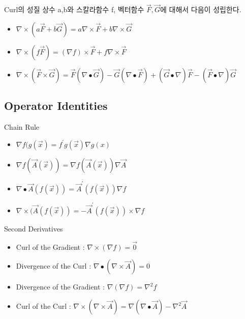 \documentclass{beamer}
\begin{document}
\begin{frame}{Curl의 성질} 
상수 a,b와 스칼라함수 f, 벡터함수 $\vec{F}, \vec{G}$에 대해서 다음이 성립한다. 
\begin{itemize} 
\item $\nabla \times (a\vec{F} + b\vec{G}) = a \nabla \times \vec{F} + b \nabla \times \vec{G}$
\item $\nabla  \times (f \vec{F}) = (\nabla f) \times \vec{F}   + f \nabla \times \vec{F}$
\item $\nabla \times (\vec{F} \times \vec{G}) = \vec{F} (\nabla \bullet \vec{G}) - \vec{G} (\nabla \bullet \vec{F}) + (\vec{G} \bullet \nabla)\vec{F} - (\vec{F} \bullet \nabla) \vec{G}$
\end{itemize}
\end{frame}


\subsection{Operator Identities}


\begin{frame}{Chain Rule}  
\begin{itemize} 
\item $\nabla f(g(\vec{x}) = f^{\prime}g(\vec{x}) \nabla g(x)$ 
\item $\nabla f(\vec{A}(\vec{x})) = \nabla f(\vec{A}(\vec{x})) \nabla \vec{A}$
\item $\nabla \bullet \vec{A}(f(\vec{x})) = \vec{A}^{\prime}(f(\vec{x})) \nabla f$
\item $\nabla \times (\vec{A}(f(\vec{x})) = - \vec{A}^{\prime} (f(\vec{x})) \times \nabla f$
\end{itemize}
\end{frame}





\begin{frame}{Second Derivatives} 
\begin{itemize} 
\item Curl of the Gradient : $\nabla \times (\nabla f) = \vec{0}$
\item Divergence of the Curl : $\nabla \bullet (\nabla \times \vec{A}) = 0$ 
\item Divergence of the Gradient : $\nabla(\nabla f) = \nabla^2 f$
\item Curl of the Curl : $\nabla \times (\nabla \times \vec{A}) = \nabla (\nabla \bullet \vec{A}) - \nabla^2\vec{A}$
\end{itemize}
\end{frame}
\end{document}
